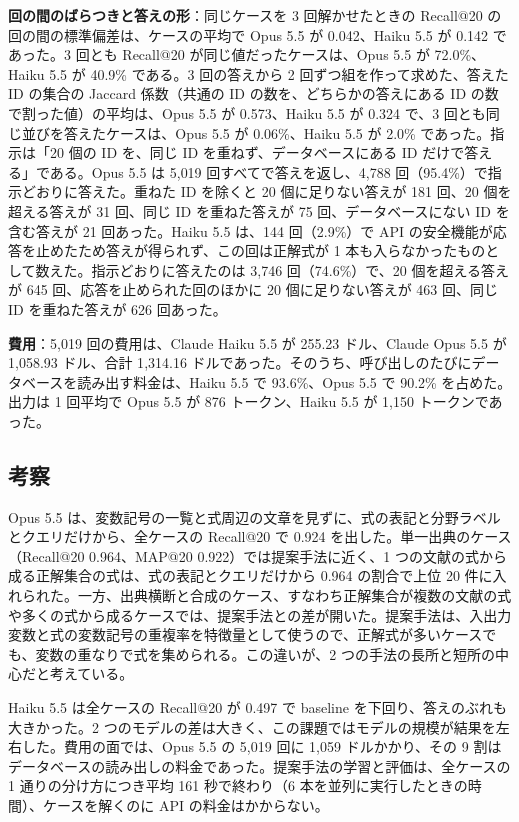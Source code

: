\documentclass[a4j,dvipdfmx,10pt]{jresume}
\begin{document}
\textbf{回の間のばらつきと答えの形}：同じケースを 3 回解かせたときの Recall@20 の回の間の標準偏差は、ケースの平均で Opus 5.5 が 0.042、Haiku 5.5 が 0.142 であった。3 回とも Recall@20 が同じ値だったケースは、Opus 5.5 が 72.0\%、Haiku 5.5 が 40.9\% である。3 回の答えから 2 回ずつ組を作って求めた、答えた ID の集合の Jaccard 係数（共通の ID の数を、どちらかの答えにある ID の数で割った値）の平均は、Opus 5.5 が 0.573、Haiku 5.5 が 0.324 で、3 回とも同じ並びを答えたケースは、Opus 5.5 が 0.06\%、Haiku 5.5 が 2.0\% であった。指示は「20 個の ID を、同じ ID を重ねず、データベースにある ID だけで答える」である。Opus 5.5 は 5{,}019 回すべてで答えを返し、4{,}788 回（95.4\%）で指示どおりに答えた。重ねた ID を除くと 20 個に足りない答えが 181 回、20 個を超える答えが 31 回、同じ ID を重ねた答えが 75 回、データベースにない ID を含む答えが 21 回あった。Haiku 5.5 は、144 回（2.9\%）で API の安全機能が応答を止めたため答えが得られず、この回は正解式が 1 本も入らなかったものとして数えた。指示どおりに答えたのは 3{,}746 回（74.6\%）で、20 個を超える答えが 645 回、応答を止められた回のほかに 20 個に足りない答えが 463 回、同じ ID を重ねた答えが 626 回あった。

\textbf{費用}：5{,}019 回の費用は、Claude Haiku 5.5 が 255.23 ドル、Claude Opus 5.5 が 1{,}058.93 ドル、合計 1{,}314.16 ドルであった。そのうち、呼び出しのたびにデータベースを読み出す料金は、Haiku 5.5 で 93.6\%、Opus 5.5 で 90.2\% を占めた。出力は 1 回平均で Opus 5.5 が 876 トークン、Haiku 5.5 が 1{,}150 トークンであった。

\subsection{考察}
Opus 5.5 は、変数記号の一覧と式周辺の文章を見ずに、式の表記と分野ラベルとクエリだけから、全ケースの Recall@20 で 0.924 を出した。単一出典のケース（Recall@20 0.964、MAP@20 0.922）では提案手法に近く、1 つの文献の式から成る正解集合の式は、式の表記とクエリだけから 0.964 の割合で上位 20 件に入れられた。一方、出典横断と合成のケース、すなわち正解集合が複数の文献の式や多くの式から成るケースでは、提案手法との差が開いた。提案手法は、入出力変数と式の変数記号の重複率を特徴量として使うので、正解式が多いケースでも、変数の重なりで式を集められる。この違いが、2 つの手法の長所と短所の中心だと考えている。

Haiku 5.5 は全ケースの Recall@20 が 0.497 で baseline を下回り、答えのぶれも大きかった。2 つのモデルの差は大きく、この課題ではモデルの規模が結果を左右した。費用の面では、Opus 5.5 の 5{,}019 回に 1{,}059 ドルかかり、その 9 割はデータベースの読み出しの料金であった。提案手法の学習と評価は、全ケースの 1 通りの分け方につき平均 161 秒で終わり（6 本を並列に実行したときの時間）、ケースを解くのに API の料金はかからない。
\end{document}
